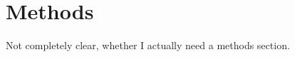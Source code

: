 \chapter{Methods}
\label{chapter:methods}
Not completely clear, whether I actually need a methods section.
